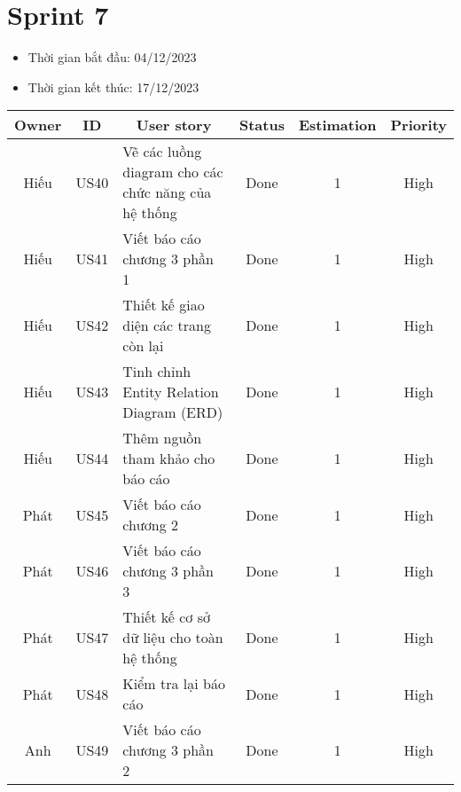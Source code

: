 \section{Sprint 7}
\begin{itemize}
    \item Thời gian bắt đầu: 04/12/2023
    \item Thời gian kết thúc: 17/12/2023
\end{itemize}
\begin{table}[H]
    \begin{tabular}{|c|c|m{6cm}|c|c|c|}
    \hline
    \textbf{Owner} & \textbf{ID} & \multicolumn{1}{c|}{\textbf{User story}}                                & \textbf{Status} & \textbf{Estimation} & \textbf{Priority} \\ \hline
    Hiếu         & US40        & Vẽ các luồng diagram cho các chức năng của hệ thống                     & Done            & 1                   & High         \\ \hline
    Hiếu        & US41        & Viết báo cáo chương 3 phần 1                     & Done            & 1                   & High         \\ \hline
    Hiếu          & US42        & Thiết kế giao diện các trang còn lại                    & Done            & 1                   & High         \\ \hline
    Hiếu         & US43        & Tinh chỉnh Entity Relation Diagram (ERD)                     & Done            & 1                   & High         \\ \hline
    Hiếu         & US44        & Thêm nguồn tham khảo cho báo cáo                     & Done            & 1                   & High         \\ \hline
    Phát          & US45        & Viết báo cáo chương 2                    & Done            & 1                   & High         \\ \hline
    Phát         & US46        & Viết báo cáo  chương 3 phần 3                    & Done            & 1                   & High         \\ \hline
    Phát         & US47        & Thiết kế cơ sở dữ liệu cho toàn hệ thống                     & Done            & 1                   & High         \\ \hline
    Phát          & US48        &Kiểm tra lại báo cáo                    & Done            & 1                   & High         \\ \hline
    Anh         & US49        & Viết báo cáo chương 3 phần 2                     & Done            & 1                   & High         \\ \hline

\end{tabular}
\end{table}
